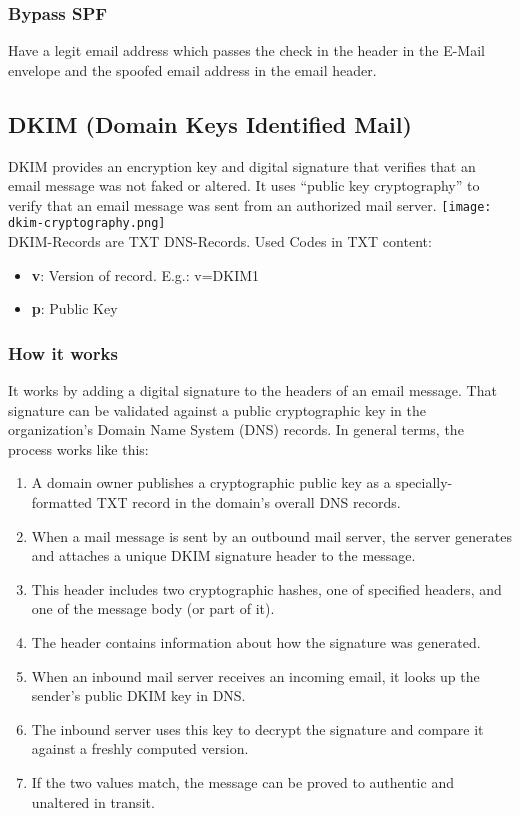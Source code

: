\subsubsection{Bypass SPF}
Have a legit email address which passes the check in the header in the E-Mail envelope and the spoofed email address in the email header.





\subsection{DKIM (Domain Keys Identified Mail)}
DKIM provides an encryption key and digital signature that verifies that an email message was not faked or altered.
It uses ``public key cryptography'' to verify that an email message was sent from an authorized mail server.
\texttt{[image: dkim-cryptography.png]}\\

DKIM-Records are TXT DNS-Records. Used Codes in TXT content:
\begin{itemize}
  \item \textbf{v}: Version of record. E.g.: v=DKIM1
  \item \textbf{p}: Public Key
\end{itemize}

\subsubsection{How it works}
It works by adding a digital signature to the headers of an email message.
That signature can be validated against a public cryptographic key in the organization's Domain Name System (DNS) records. In general terms, the process works like this:\\

\begin{enumerate}
  \item A domain owner publishes a cryptographic public key as a specially-formatted TXT record in the domain's overall DNS records.
  \item When a mail message is sent by an outbound mail server, the server generates and attaches a unique DKIM signature header to the message.
  \item This header includes two cryptographic hashes, one of specified headers, and one of the message body (or part of it).
  \item The header contains information about how the signature was generated.
  \item When an inbound mail server receives an incoming email, it looks up the sender's public DKIM key in DNS.
  \item The inbound server uses this key to decrypt the signature and compare it against a freshly computed version.
  \item If the two values match, the message can be proved to authentic and unaltered in transit.
\end{enumerate}


